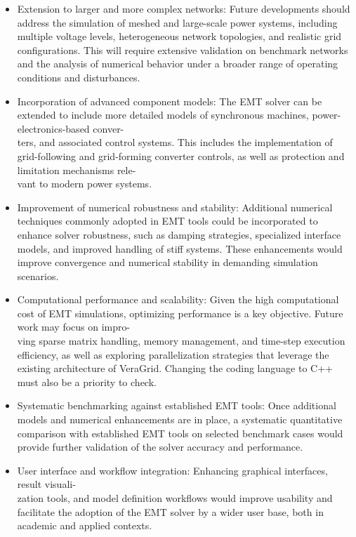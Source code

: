 \begin{itemize}
    \item Extension to larger and more complex networks: 
    Future developments should address the simulation of meshed and large-scale power systems, including 
    multiple voltage levels, heterogeneous network topologies, and realistic grid configurations. 
    This will require extensive validation on benchmark networks and the analysis of numerical behavior
     under a broader range of operating conditions and disturbances.

    \item Incorporation of advanced component models: 
    The EMT solver can be extended to include more detailed models of synchronous machines, 
    power-electronics-based conver-\\ters, and associated control systems. This includes the implementation of 
    grid-following and grid-forming converter controls, as well as protection and limitation mechanisms 
    rele-\\vant to modern power systems.

    \item Improvement of numerical robustness and stability: 
    Additional numerical techniques commonly adopted in EMT tools could be incorporated to enhance solver 
    robustness, such as damping strategies, specialized interface models, and improved handling of stiff 
    systems. These enhancements would improve convergence and numerical stability in demanding simulation 
    scenarios.

    \item Computational performance and scalability: 
    Given the high computational cost of EMT simulations, optimizing performance is a key objective. 
    Future work may focus on impro-\\ving sparse matrix handling, memory management, and time-step execution 
    efficiency, as well as exploring parallelization strategies that leverage the existing architecture of 
    VeraGrid. Changing the coding language to C++ must also be a priority to check.

    \item Systematic benchmarking against established EMT tools: 
    Once additional models and numerical enhancements are in place, a systematic quantitative comparison with 
    established EMT tools on selected benchmark cases would provide further validation of the solver accuracy 
    and performance.

    \item User interface and workflow integration: 
    Enhancing graphical interfaces, result visuali-\\zation tools, and model definition workflows would
    improve usability and facilitate the adoption of the EMT solver by a wider user base, both in academic 
    and applied contexts.
\end{itemize}
